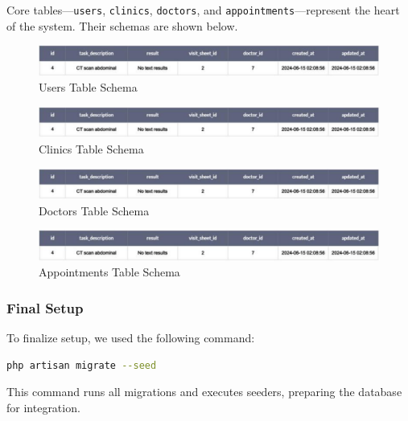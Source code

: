 \documentclass[12pt]{report}
\begin{document}
Core tables—\texttt{users}, \texttt{clinics}, \texttt{doctors}, and \texttt{appointments}—represent the heart of the system. Their schemas are shown below.

\begin{figure}[H]
\centering
\includegraphics[width=1\textwidth]{images/table@2x.pdf}
\caption{Users Table Schema}
\end{figure}

\begin{figure}[H]
\centering
\includegraphics[width=1\textwidth]{images/table@2x.pdf}
\caption{Clinics Table Schema}
\end{figure}

\begin{figure}[H]
\centering
\includegraphics[width=1\textwidth]{images/table@2x.pdf}
\caption{Doctors Table Schema}
\end{figure}

\begin{figure}[H]
\centering
\includegraphics[width=1\textwidth]{images/table@2x.pdf}
\caption{Appointments Table Schema}
\end{figure}

\subsubsection*{Final Setup}
To finalize setup, we used the following command:

\begin{lstlisting}[style=darkbash, language=bash, caption={Laravel command to run migrations and seeders}]
php artisan migrate --seed
\end{lstlisting}

This command runs all migrations and executes seeders, preparing the database for integration.
\end{document}
